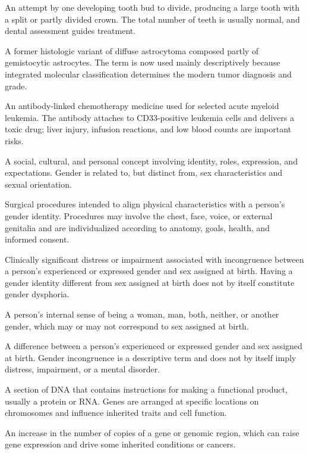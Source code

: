  An attempt by one developing tooth bud to divide, producing a large tooth with a split or partly divided crown. The total number of teeth is usually normal, and dental assessment guides treatment.

 A former histologic variant of diffuse astrocytoma composed partly of gemistocytic astrocytes. The term is now used mainly descriptively because integrated molecular classification determines the modern tumor diagnosis and grade.

 An antibody-linked chemotherapy medicine used for selected acute myeloid leukemia. The antibody attaches to CD33-positive leukemia cells and delivers a toxic drug; liver injury, infusion reactions, and low blood counts are important risks.

 A social, cultural, and personal concept involving identity, roles, expression, and expectations. Gender is related to, but distinct from, sex characteristics and sexual orientation.

 Surgical procedures intended to align physical characteristics with a person’s gender identity. Procedures may involve the chest, face, voice, or external genitalia and are individualized according to anatomy, goals, health, and informed consent.

 Clinically significant distress or impairment associated with incongruence between a person’s experienced or expressed gender and sex assigned at birth. Having a gender identity different from sex assigned at birth does not by itself constitute gender dysphoria.

 A person’s internal sense of being a woman, man, both, neither, or another gender, which may or may not correspond to sex assigned at birth.

 A difference between a person’s experienced or expressed gender and sex assigned at birth. Gender incongruence is a descriptive term and does not by itself imply distress, impairment, or a mental disorder.

 A section of DNA that contains instructions for making a functional product, usually a protein or RNA. Genes are arranged at specific locations on chromosomes and influence inherited traits and cell function.

 An increase in the number of copies of a gene or genomic region, which can raise gene expression and drive some inherited conditions or cancers.

